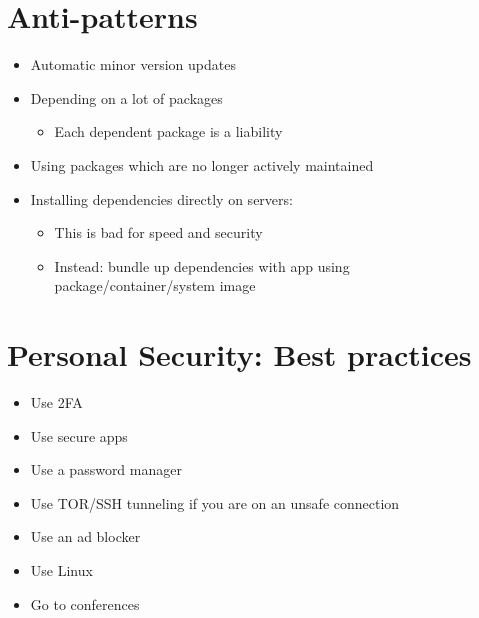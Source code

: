 \documentclass{article}[18pt]
\begin{document}
\section{Anti-patterns}
\begin{itemize}
	\item Automatic minor version updates
	\item Depending on a lot of packages
	\begin{itemize}
		\item Each dependent package is a liability
	\end{itemize}
	\item Using packages which are no longer actively maintained
	\item Installing dependencies directly on servers:
	\begin{itemize}
		\item This is bad for speed and security
		\item Instead: bundle up dependencies with app using package/container/system image
	\end{itemize}
\end{itemize}
\section{Personal Security: Best practices}
\begin{itemize}
	\item Use 2FA
	\item Use secure apps
	\item Use a password manager
	\item Use TOR/SSH tunneling if you are on an unsafe connection
	\item Use an ad blocker
	\item Use Linux
	\item Go to conferences
\end{itemize}
\end{document}

